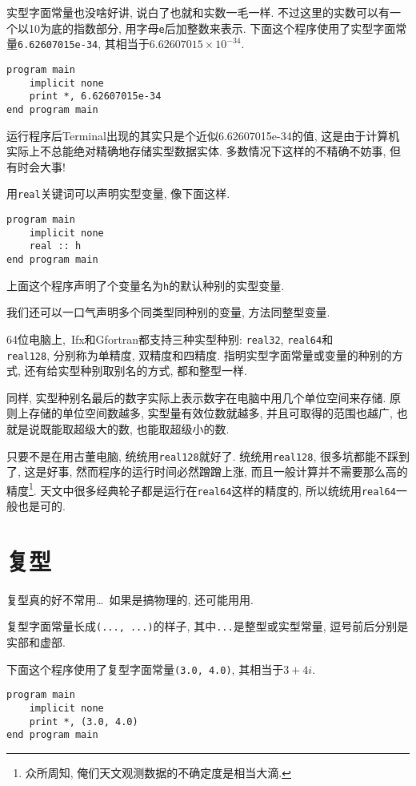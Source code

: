 实型字面常量也没啥好讲, 说白了也就和实数一毛一样. 不过这里的实数可以有一个以10为底的指数部分, 用字母\texttt{e}后加整数来表示. 下面这个程序使用了实型字面常量\texttt{6.62607015e-34}, 其相当于$6.62607015\times10^{-34}$.
\begin{lstlisting}
program main
    implicit none
    print *, 6.62607015e-34
end program main
\end{lstlisting}
运行程序后Terminal出现的其实只是个近似6.62607015e-34的值, 这是由于计算机实际上不总能绝对精确地存储实型数据实体. 多数情况下这样的不精确不妨事, 但有时会大事!

用\texttt{real}关键词可以声明实型变量, 像下面这样.
\begin{lstlisting}
program main
    implicit none
    real :: h
end program main
\end{lstlisting}

上面这个程序声明了个变量名为\texttt{h}的默认种别的实型变量.

我们还可以一口气声明多个同类型同种别的变量, 方法同整型变量.

64位电脑上,~Ifx和Gfortran都支持三种实型种别: \texttt{real32}, \texttt{real64}和\\\texttt{real128}, 分别称为单精度, 双精度和四精度. 指明实型字面常量或变量的种别的方式, 还有给实型种别取别名的方式, 都和整型一样.

同样, 实型种别名最后的数字实际上表示数字在电脑中用几个单位空间来存储. 原则上存储的单位空间数越多, 实型量有效位数就越多, 并且可取得的范围也越广, 也就是说既能取超级大的数, 也能取超级小的数.

只要不是在用古董电脑, 统统用\texttt{real128}就好了. 统统用\texttt{real128}, 很多坑都能不踩到了, 这是好事, 然而程序的运行时间必然蹭蹭上涨, 而且一般计算并不需要那么高的精度\footnote{众所周知, 俺们天文观测数据的不确定度是相当大滴.}. 天文中很多经典轮子都是运行在\texttt{real64}这样的精度的, 所以统统用\texttt{real64}一般也是可的.

\section{复型}

复型真的好不常用\dots{}~如果是搞物理的, 还可能用用.

复型字面常量长成\texttt{(..., ...)}的样子, 其中\texttt{...}是整型或实型常量, 逗号前后分别是实部和虚部.

下面这个程序使用了复型字面常量\texttt{(3.0, 4.0)}, 其相当于$3+4i$.
\begin{lstlisting}
program main
    implicit none
    print *, (3.0, 4.0)
end program main
\end{lstlisting}

